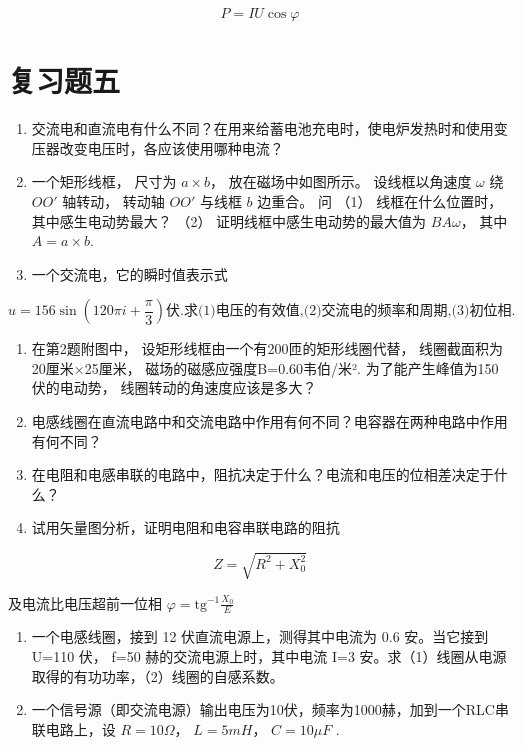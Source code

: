 \[
P = I U \cos \varphi
\]

\section{复习题五}\label{ux590dux4e60ux9898ux4e94}

\begin{enumerate}
\def\labelenumi{\arabic{enumi}.}
\item
  交流电和直流电有什么不同？在用来给蓄电池充电时，使电炉发热时和使用变压器改变电压时，各应该使用哪种电流？
\item
  一个矩形线框， 尺寸为 \(a \times b\)， 放在磁场中如图所示。
  设线框以角速度 \(\omega\) 绕 \(OO'\) 轴转动， 转动轴 \(OO'\) 与线框
  \(b\) 边重合。 问 （1） 线框在什么位置时， 其中感生电动势最大？ （2）
  证明线框中感生电动势的最大值为 \(BA\omega\)， 其中 \(A = a \times b\).
\item
  一个交流电，它的瞬时值表示式
\end{enumerate}

\[
u = 156 \sin \left(120 \pi i + \frac{\pi}{3}\right) \text{伏.求(1)电压的有效值,(2)交流电的频率和周期,(3)初位相.}
\]

\begin{enumerate}
\def\labelenumi{\arabic{enumi}.}
\setcounter{enumi}{3}
\item
  在第2题附图中， 设矩形线框由一个有200匝的矩形线圈代替，
  线圈截面积为20厘米×25厘米， 磁场的磁感应强度B=0.60韦伯/米².
  为了能产生峰值为150伏的电动势， 线圈转动的角速度应该是多大？
\item
  电感线圈在直流电路中和交流电路中作用有何不同？电容器在两种电路中作用有何不同？
\item
  在电阻和电感串联的电路中，阻抗决定于什么？电流和电压的位相差决定于什么？
\item
  试用矢量图分析，证明电阻和电容串联电路的阻抗
\end{enumerate}

\[
Z = \sqrt{R^{2} + X_{0}^{2}}
\]

及电流比电压超前一位相 \(\varphi = \mathrm{tg}^{-1}\frac{X_0}{E}\)

\begin{enumerate}
\def\labelenumi{\arabic{enumi}.}
\setcounter{enumi}{7}
\item
  一个电感线圈，接到 12 伏直流电源上，测得其中电流为 0.6 安。当它接到
  U=110 伏， f=50 赫的交流电源上时，其中电流 I=3
  安。求（1）线圈从电源取得的有功功率，（2）线圈的自感系数。
\item
  一个信号源（即交流电源）输出电压为10伏，频率为1000赫，加到一个RLC串联电路上，设
  \(R=10\Omega\)， \(L=5mH\)， \(C=10\mu F\) .
\end{enumerate}

